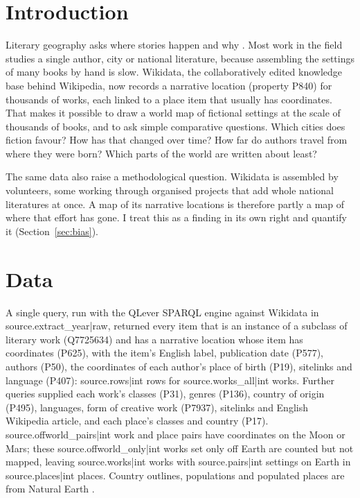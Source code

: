 \documentclass[11pt,a4paper]{article}
\begin{document}
\section{Introduction}
Literary geography asks where stories happen and why \citep{moretti1998}. Most work in the field studies a single author, city or national literature, because assembling the settings of many books by hand is slow. Wikidata, the collaboratively edited knowledge base behind Wikipedia, now records a narrative location (property P840) for thousands of works, each linked to a place item that usually has coordinates. That makes it possible to draw a world map of fictional settings at the scale of thousands of books, and to ask simple comparative questions. Which cities does fiction favour? How has that changed over time? How far do authors travel from where they were born? Which parts of the world are written about least?

The same data also raise a methodological question. Wikidata is assembled by volunteers, some working through organised projects that add whole national literatures at once. A map of its narrative locations is therefore partly a map of where that effort has gone. I treat this as a finding in its own right and quantify it (Section~\ref{sec:bias}).

\section{Data}
A single query, run with the QLever SPARQL engine \citep{qlever} against Wikidata \citep{wikidata} in {{source.extract_year|raw}}, returned every item that is an instance of a subclass of literary work (Q7725634) and has a narrative location whose item has coordinates (P625), with the item's English label, publication date (P577), authors (P50), the coordinates of each author's place of birth (P19), sitelinks and language (P407): {{source.rows|int}} rows for {{source.works_all|int}} works. Further queries supplied each work's classes (P31), genres (P136), country of origin (P495), languages, form of creative work (P7937), sitelinks and English Wikipedia article, and each place's classes and country (P17). {{source.offworld_pairs|int}} work and place pairs have coordinates on the Moon or Mars; these {{source.offworld_only|int}} works set only off Earth are counted but not mapped, leaving {{source.works|int}} works with {{source.pairs|int}} settings on Earth in {{source.places|int}} places. Country outlines, populations and populated places are from Natural Earth \citep{naturalearth}.
\end{document}
